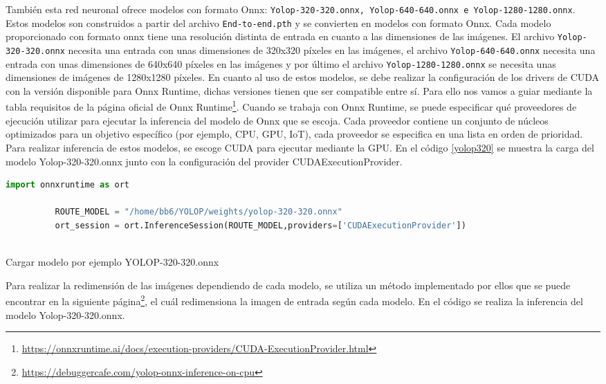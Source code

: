       También esta red neuronal ofrece modelos con formato Onnx: \texttt{Yolop-320-320.onnx, Yolop-640-640.onnx e Yolop-1280-1280.onnx}. Estos modelos son construidos a partir del archivo 
      \texttt{End-to-end.pth} y se convierten en modelos con formato Onnx. Cada modelo proporcionado con formato onnx tiene una resolución distinta de entrada en cuanto a las dimensiones
      de las imágenes. El archivo \texttt{Yolop-320-320.onnx} necesita una entrada con unas dimensiones de 320x320 píxeles en las imágenes, el archivo \texttt{Yolop-640-640.onnx} necesita 
      una entrada con unas dimensiones de 640x640 píxeles en las imágenes y por último el archivo \texttt{Yolop-1280-1280.onnx} se necesita unas dimensiones de imágenes de 1280x1280 píxeles. 
      En cuanto al uso de estos modelos, se debe realizar la configuración de los drivers de CUDA con la versión disponible para Onnx Runtime, 
      dichas versiones tienen que ser compatible entre sí. Para ello nos vamos a guiar mediante la tabla requisitos de la página oficial de Onnx Runtime\footnote{\url{https://onnxruntime.ai/docs/execution-providers/CUDA-ExecutionProvider.html}}. \newline
      Cuando se trabaja con Onnx Runtime, se puede especificar qué proveedores de ejecución utilizar para ejecutar la inferencia del modelo de Onnx que se escoja. Cada proveedor 
      contiene un conjunto de núcleos optimizados para un objetivo específico (por ejemplo, CPU, GPU, IoT), cada proveedor se especifica en una lista en orden de prioridad. Para realizar 
      inferencia de estos modelos, se escoge CUDA para ejecutar mediante la GPU. En el código \ref{yolop320} se muestra la carga del modelo Yolop-320-320.onnx junto con la configuración
      del provider CUDAExecutionProvider. 
      
      \begin{code}[h]
        \begin{lstlisting}[language=Python]
          import onnxruntime as ort

          ROUTE_MODEL = "/home/bb6/YOLOP/weights/yolop-320-320.onnx"
          ort_session = ort.InferenceSession(ROUTE_MODEL,providers=['CUDAExecutionProvider'])
      
        \end{lstlisting}
        \caption[Cargar modelo]{Cargar modelo por ejemplo YOLOP-320-320.onnx}
        \label{yolop320}
        \end{code}  

        Para realizar la redimensión de las imágenes dependiendo de cada modelo, se utiliza un método implementado por ellos 
        que se puede encontrar en la siguiente página\footnote{\url{https://debuggercafe.com/yolop-onnx-inference-on-cpu}}, el cuál redimensiona la imagen de entrada según cada modelo. En el código 
        \label{cod:Inferencia_onnx} se realiza la inferencia del modelo Yolop-320-320.onnx. 


